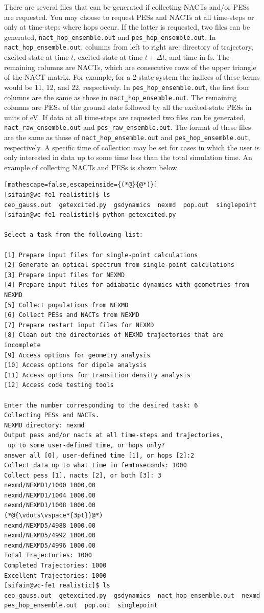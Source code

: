 \documentclass[letterpaper,12pt,titlepage]{article}
\begin{document}
There are several files that can be generated if collecting NACTs and/or PESs are requested.  You may choose to request PESs and NACTs at all time-steps or only at time-steps where hops occur.  If the latter is requested, two files can be generated, \verb+nact_hop_ensemble.out+ and \verb+pes_hop_ensemble.out+.  In \verb+nact_hop_ensemble.out+, columns from left to right are: directory of trajectory, excited-state at time $t$, excited-state at time $t+\Delta t$, and time in fs.  The remaining columns are NACTs, which are consecutive rows of the upper triangle of the NACT matrix.  For example, for a 2-state system the indices of these terms would be 11, 12, and 22, respectively.  In \verb+pes_hop_ensemble.out+, the first four columns are the same as those in \verb+nact_hop_ensemble.out+.  The remaining columns are PESs of the ground state followed by all the excited-state PESs in units of eV.  If data at all time-steps are requested two files can be generated, \verb+nact_raw_ensemble.out+ and \verb+pes_raw_ensemble.out+.  The format of these files are the same as those of \verb+nact_hop_ensemble.out+ and \verb+pes_hop_ensemble.out+, respectively.  A specific time of collection may be set for cases in which the user is only interested in data up to some time less than the total simulation time.  An example of collecting NACTs and PESs is shown below.
\begin{lstlisting}[mathescape=false,escapeinside={(*@}{@*)}]
[sifain@wc-fe1 realistic]$ ls
ceo_gauss.out  getexcited.py  gsdynamics  nexmd  pop.out  singlepoint
[sifain@wc-fe1 realistic]$ python getexcited.py 

Select a task from the following list:

[1] Prepare input files for single-point calculations
[2] Generate an optical spectrum from single-point calculations
[3] Prepare input files for NEXMD
[4] Prepare input files for adiabatic dynamics with geometries from NEXMD
[5] Collect populations from NEXMD
[6] Collect PESs and NACTs from NEXMD
[7] Prepare restart input files for NEXMD
[8] Clean out the directories of NEXMD trajectories that are incomplete
[9] Access options for geometry analysis
[10] Access options for dipole analysis
[11] Access options for transition density analysis
[12] Access code testing tools

Enter the number corresponding to the desired task: 6
Collecting PESs and NACTs.
NEXMD directory: nexmd
Output pess and/or nacts at all time-steps and trajectories,
 up to some user-defined time, or hops only?
answer all [0], user-defined time [1], or hops [2]:2
Collect data up to what time in femtoseconds: 1000
Collect pess [1], nacts [2], or both [3]: 3
nexmd/NEXMD1/1000 1000.00
nexmd/NEXMD1/1004 1000.00
nexmd/NEXMD1/1008 1000.00
(*@{\vdots\vspace*{3pt}}@*)
nexmd/NEXMD5/4988 1000.00
nexmd/NEXMD5/4992 1000.00
nexmd/NEXMD5/4996 1000.00
Total Trajectories: 1000
Completed Trajectories: 1000
Excellent Trajectories: 1000
[sifain@wc-fe1 realistic]$ ls
ceo_gauss.out  getexcited.py  gsdynamics  nact_hop_ensemble.out  nexmd  pes_hop_ensemble.out  pop.out  singlepoint
\end{lstlisting}
\end{document}
